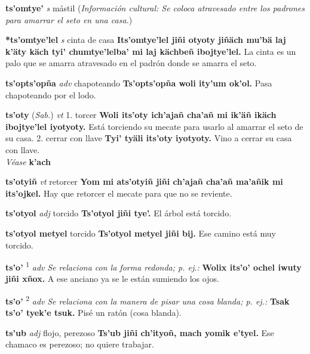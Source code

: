 \documentclass[10pt]{scrbook}
\newcommand{\entry}[1]{\textbf{#1}}
\newcommand{\onedefinition}[1]{#1.}
\newcommand{\defsuperscript}[1]{\textsuperscript{#1}}
\newcommand{\nontranslationdef}[1]{\textit{#1}}
\newcommand{\partofspeech}[1]{\textit{#1}}
\newcommand{\spanishtranslation}[1]{#1}
\newcommand{\cholexample}[1]{\textbf{#1}}
\newcommand{\exampletranslation}[1]{#1}
\newcommand{\alsosee}[1]{\\\textit{Véase} \textbf{#1}}
\newcommand{\relevantdialect}[1]{(\textit{#1})}
\newcommand{\culturalinformation}[1]{(\textit{#1})}
\begin{document}
\begin{multicols}{2}
\entry{ts'omtye'}
\partofspeech{s}
\spanishtranslation{mástil}
\culturalinformation{Información cultural: Se coloca atravesado entre los padrones para amarrar el seto en una casa.}

\entry{*ts'omtye'lel}
\partofspeech{s}
\spanishtranslation{cinta de casa}
\cholexample{Its'omtye'lel jiñi otyoty jiñäch mu'bä laj k'äty käch tyi' chumtye'lelba' mi laj kächbeñ ibojtye'lel.}
\exampletranslation{La cinta es un palo que se amarra atravesado en el padrón donde se amarra el seto.}

\entry{ts'opts'opña}
\partofspeech{adv}
\spanishtranslation{chapoteando}
\cholexample{Ts'opts'opña woli ity'um ok'ol.}
\exampletranslation{Pasa chapoteando por el lodo.}

\entry{ts'oty}
\relevantdialect{Sab.}
\partofspeech{vt}
\onedefinition{1}
\spanishtranslation{torcer}
\cholexample{Woli its'oty ich'ajañ cha'añ mi ik'äñ ikäch ibojtye'lel iyotyoty.}
\exampletranslation{Está torciendo su mecate para usarlo al amarrar el seto de su casa.}
\onedefinition{2}
\spanishtranslation{cerrar con llave}
\cholexample{Tyi' tyäli its'oty iyotyoty.}
\exampletranslation{Vino a cerrar su casa con llave.}
\alsosee{k'ach}

\entry{ts'otyiñ}
\partofspeech{vt}
\spanishtranslation{retorcer}
\cholexample{Yom mi ats'otyiñ jiñi ch'ajañ cha'añ ma'añik mi its'ojkel.}
\exampletranslation{Hay que retorcer el mecate para que no se reviente.}

\entry{ts'otyol}
\partofspeech{adj}
\spanishtranslation{torcido}
\cholexample{Ts'otyol jiñi tye'.}
\exampletranslation{El árbol está torcido.}

\entry{ts'otyol metyel}
\spanishtranslation{torcido}
\cholexample{Ts'otyol metyel jiñi bij.}
\exampletranslation{Ese camino está muy torcido.}

\entry{ts'o'}
\defsuperscript{1}
\partofspeech{adv}
\nontranslationdef{Se relaciona con la forma redonda; p. ej.:}
\cholexample{Wolix its'o' ochel iwuty jiñi xñox.}
\exampletranslation{A ese anciano ya se le están sumiendo los ojos.}

\entry{ts'o'}
\defsuperscript{2}
\partofspeech{adv}
\nontranslationdef{Se relaciona con la manera de pisar una cosa blanda; p. ej.:}
\cholexample{Tsak ts'o' tyek'e tsuk.}
\exampletranslation{Pisé un ratón (cosa blanda).}

\entry{ts'ub}
\partofspeech{adj}
\spanishtranslation{flojo, perezoso}
\cholexample{Ts'ub jiñi ch'ityoñ, mach yomik e'tyel.}
\exampletranslation{Ese chamaco es perezoso; no quiere trabajar.}


\end{multicols}
\end{document}
